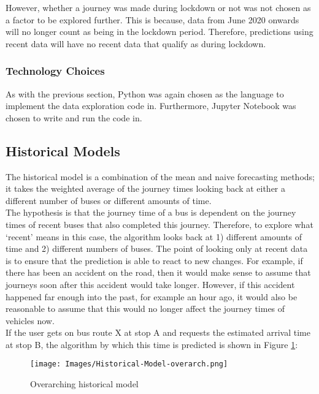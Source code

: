 However, whether a journey was made during lockdown or not was not chosen as a factor to be explored further. This is because, data from June 2020 onwards will no longer count as being in the lockdown period. Therefore, predictions using recent data will have no recent data that qualify as during lockdown.

\subsubsection{Technology Choices}

As with the previous section, Python was again chosen as the language to implement the data exploration code in. Furthermore, Jupyter Notebook was chosen to write and run the code in.  

\subsection{Historical Models}
\label{section:historical-model-design}

The historical model is a combination of the mean and naive forecasting methods; it takes the weighted average of the journey times looking back at either a different number of buses or different amounts of time. \\

The hypothesis is that the journey time of a bus is dependent on the journey times of recent buses that also completed this journey. Therefore, to explore what `recent' means in this case, the algorithm looks back at 1) different amounts of time and 2) different numbers of buses. The point of looking only at recent data is to ensure that the prediction is able to react to new changes. For example, if there has been an accident on the road, then it would make sense to assume that journeys soon after this accident would take longer. However, if this accident happened far enough into the past, for example an hour ago, it would also be reasonable to assume that this would no longer affect the journey times of vehicles now. \\

If the user gets on bus route X at stop A and requests the estimated arrival time at stop B, the algorithm by which this time is predicted is shown in Figure \ref{fig:historical-flow}: 

\begin{figure}[H]
\begin{center}
    \texttt{[image: Images/Historical-Model-overarch.png]}
    \caption{Overarching historical model}
    \label{fig:historical-flow}
\end{center}
\end{figure}

